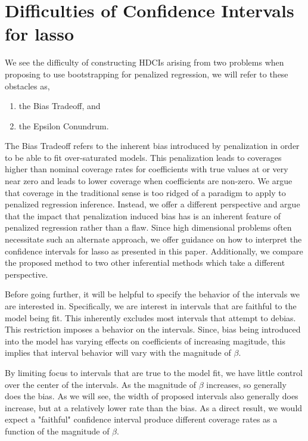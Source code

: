 \section{Difficulties of Confidence Intervals for lasso}\label{Sec:Difficulties}

We see the difficulty of constructing HDCIs arising from two problems when proposing to use bootstrapping for penalized regression, we will refer to these obstacles as,

\begin{enumerate}
\item the Bias Tradeoff, and
\item the Epsilon Conundrum.
\end{enumerate}

The Bias Tradeoff refers to the inherent bias introduced by penalization in order to be able to fit over-saturated models. This penalization leads to coverages higher than nominal coverage rates for coefficients with true values at or very near zero and leads to lower coverage when coefficients are non-zero. We argue that coverage in the traditional sense is too ridged of a paradigm to apply to penalized regression inference. Instead, we offer a different perspective and argue that the impact that penalization induced bias has is an inherent feature of penalized regression rather than a flaw. Since high dimensional problems often necessitate such an alternate approach, we offer guidance on how to interpret the confidence intervals for lasso as presented in this paper. Additionally, we compare the proposed method to two other inferential methods which take a different perspective.

Before going further, it will be helpful to specify the behavior of the intervals we are interested in. Specifically, we are interest in intervals that are faithful to the model being fit. This inherently excludes most intervals that attempt to debias. This restriction imposes a behavior on the intervals. Since, bias being introduced into the model has varying effects on coefficients of increasing magitude, this implies that interval behavior will vary with the magnitude of $\beta$.

By limiting focus to intervals that are true to the model fit, we have little control over the center of the intervals. As the magnitude of $\beta$ increases, so generally does the bias. As we will see, the width of proposed intervals also generally does increase, but at a relatively lower rate than the bias. As a direct result, we would expect a "faithful" confidence interval produce different coverage rates as a function of the magnitude of $\beta$.


